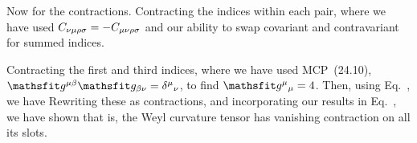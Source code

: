 \documentclass[11pt]{article}
\begin{document}
{	%
	Now for the contractions.  Contracting the indices within each pair,
	where we have used $C_{\nu \mu \rho \sigma} = -C_{\mu \nu \rho \sigma}$ and our ability to swap covariant and contravariant for summed indices.
	
	Contracting the first and third indices,
	where we have used MCP~(24.10), $\sg^{\mu \bet} \sg_{\bet \nu} = \fv{\del}{\mu}{\nu}$, to find $\fv{\sg}{\mu}{\mu} = 4$.  Then, using Eq.~, we have
	Rewriting these as contractions, and incorporating our results in Eq.~, we have shown
	that is, the Weyl curvature tensor has vanishing contraction on all its slots.
	
}
\end{document}

